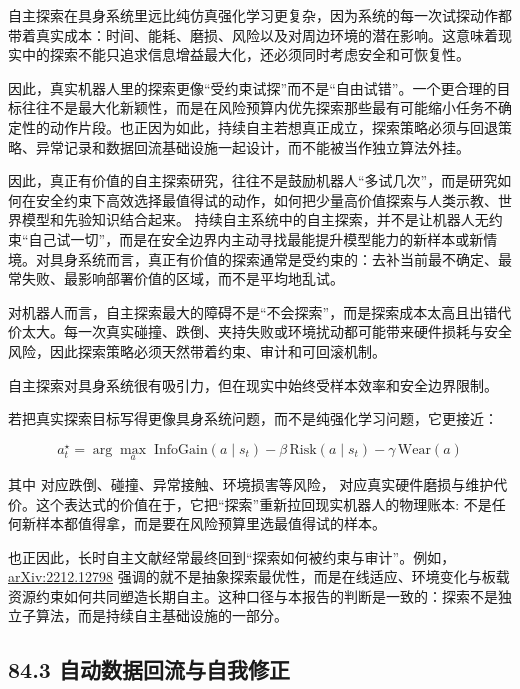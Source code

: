自主探索在具身系统里远比纯仿真强化学习更复杂，因为系统的每一次试探动作都带着真实成本：时间、能耗、磨损、风险以及对周边环境的潜在影响。这意味着现实中的探索不能只追求信息增益最大化，还必须同时考虑安全和可恢复性。

因此，真实机器人里的探索更像“受约束试探”而不是“自由试错”。一个更合理的目标往往不是最大化新颖性，而是在风险预算内优先探索那些最有可能缩小任务不确定性的动作片段。也正因为如此，持续自主若想真正成立，探索策略必须与回退策略、异常记录和数据回流基础设施一起设计，而不能被当作独立算法外挂。

因此，真正有价值的自主探索研究，往往不是鼓励机器人“多试几次”，而是研究如何在安全约束下高效选择最值得试的动作，如何把少量高价值探索与人类示教、世界模型和先验知识结合起来。 持续自主系统中的自主探索，并不是让机器人无约束“自己试一切”，而是在安全边界内主动寻找最能提升模型能力的新样本或新情境。对具身系统而言，真正有价值的探索通常是受约束的：去补当前最不确定、最常失败、最影响部署价值的区域，而不是平均地乱试。

对机器人而言，自主探索最大的障碍不是“不会探索”，而是探索成本太高且出错代价太大。每一次真实碰撞、跌倒、夹持失败或环境扰动都可能带来硬件损耗与安全风险，因此探索策略必须天然带着约束、审计和可回滚机制。

自主探索对具身系统很有吸引力，但在现实中始终受样本效率和安全边界限制。

若把真实探索目标写得更像具身系统问题，而不是纯强化学习问题，它更接近：

\begingroup
\scriptsize
\begin{equation*}
a_t^\star = \arg\max_a \; \text{InfoGain}(a \mid s_t)
- \beta \, \text{Risk}(a \mid s_t)
- \gamma \, \text{Wear}(a)
\end{equation*}
\endgroup

其中 \texttt{} 对应跌倒、碰撞、异常接触、环境损害等风险，\texttt{} 对应真实硬件磨损与维护代价。这个表达式的价值在于，它把“探索”重新拉回现实机器人的物理账本: 不是任何新样本都值得拿，而是要在风险预算里选最值得试的样本。

也正因此，长时自主文献经常最终回到“探索如何被约束与审计”。例如，\href{https://arxiv.org/abs/2212.12798}{arXiv:2212.12798} 强调的就不是抽象探索最优性，而是在线适应、环境变化与板载资源约束如何共同塑造长期自主。这种口径与本报告的判断是一致的：探索不是独立子算法，而是持续自主基础设施的一部分。

\subsection*{84.3 自动数据回流与自我修正}


